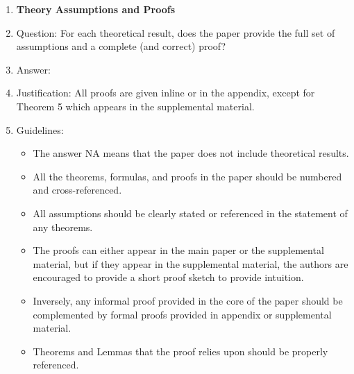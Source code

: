 \documentclass{article}
\begin{document}
\begin{enumerate}
\item {\bf Theory Assumptions and Proofs}
    \item[] Question: For each theoretical result, does the paper provide the full set of assumptions and a complete (and correct) proof?
    \item[] Answer: \answerYes{} %
    \item[] Justification: All proofs are given inline or in the appendix, except for Theorem 5 which appears in the supplemental material.
    \item[] Guidelines:
    \begin{itemize}
        \item The answer NA means that the paper does not include theoretical results. 
        \item All the theorems, formulas, and proofs in the paper should be numbered and cross-referenced.
        \item All assumptions should be clearly stated or referenced in the statement of any theorems.
        \item The proofs can either appear in the main paper or the supplemental material, but if they appear in the supplemental material, the authors are encouraged to provide a short proof sketch to provide intuition. 
        \item Inversely, any informal proof provided in the core of the paper should be complemented by formal proofs provided in appendix or supplemental material.
        \item Theorems and Lemmas that the proof relies upon should be properly referenced. 
    \end{itemize}


\end{enumerate}
\end{document}
